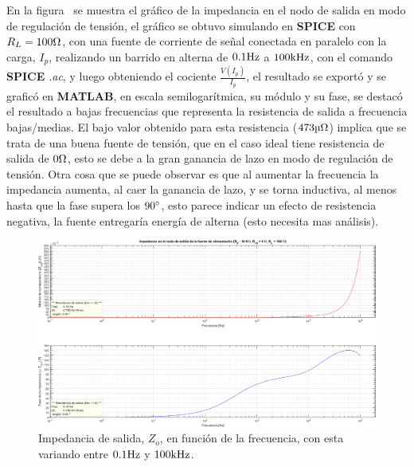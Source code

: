 
\vspace{1.5cm}


En la figura~ se muestra el gráfico de la impedancia en el nodo de salida en modo de regulación de tensión, el gráfico se obtuvo simulando en \textbf{SPICE} con $R_{L} = 100 \si[per-mode=symbol]{\ohm}$, con una fuente de corriente de señal conectada en paralelo con la carga, $I_{p}$, realizando un barrido en alterna de $0.1 \si[per-mode=symbol]{\hertz}$ a $100 \si[per-mode=symbol]{\kilo\hertz}$, con el comando \textbf{SPICE} \textit{.ac}, y luego obteniendo el cociente $\frac{V\left(I_{p}\right)}{I_{p}}$, el resultado se exportó y se graficó en \textbf{MATLAB}, en escala semilogarítmica, su módulo y su fase, se destacó el resultado a bajas frecuencias que representa la resistencia de salida a frecuencia bajas/medias. El bajo valor obtenido para esta resistencia ($473 \si[per-mode=symbol]{\micro\ohm}$) implica que se trata de una buena fuente de tensión, que en el caso ideal tiene resistencia de salida de $0 \si[per-mode=symbol]{\ohm}$, esto se debe a la gran ganancia de lazo en modo de regulación de tensión. Otra cosa que se puede observar es que al aumentar la frecuencia la impedancia aumenta, al caer la ganancia de lazo, y se torna inductiva, al menos hasta que la fase supera los $90 \si[per-mode=symbol]{\degree}$, esto parece indicar un efecto de resistencia negativa, la fuente entregaría energía de alterna (esto necesita mas análisis).




\vfill

\clearpage

\begin{figure}[H] %
\begin{center}
\includegraphics[width=1.2 \textwidth, angle=90]{./img/preguntas/p13.png}
\caption{\label{fig:fig_p13_output_impedance}\footnotesize{Impedancia de salida, $Z_{o}$, en función de la frecuencia, con esta variando entre $0.1 \si[per-mode=symbol]{\hertz}$ y $100 \si[per-mode=symbol]{\kilo\hertz}$.}}
\end{center}
\end{figure}



\clearpage
